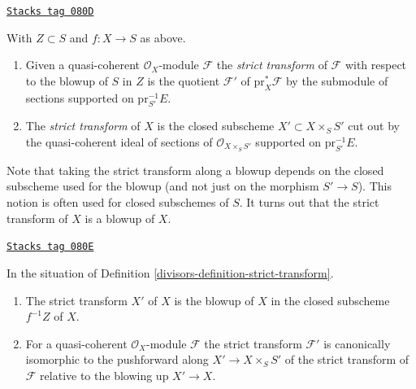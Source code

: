 \begin{definition}
\label{divisors-definition-strict-transform}
\href{https://stacks.math.columbia.edu/tag/080D}{\texttt{Stacks tag 080D}}

With $Z \subset S$ and $f : X \to S$ as above.
\begin{enumerate}
\item Given a quasi-coherent $\mathcal{O}_X$-module $\mathcal{F}$
the {\it strict transform} of $\mathcal{F}$ with respect to the blowup
of $S$ in $Z$ is the quotient $\mathcal{F}'$ of $\text{pr}_X^*\mathcal{F}$
by the submodule of sections supported on $\text{pr}_{S'}^{-1}E$.
\item The {\it strict transform} of $X$ is the closed subscheme
$X' \subset X \times_S S'$ cut out by the quasi-coherent ideal of
sections of $\mathcal{O}_{X \times_S S'}$ supported on $\text{pr}_{S'}^{-1}E$.
\end{enumerate}
\end{definition}

Note that taking the strict transform along a blowup depends on the
closed subscheme used for the blowup
(and not just on the morphism $S' \to S$).
This notion is often used for closed subschemes of $S$.
It turns out that the strict transform of $X$ is a blowup of $X$.

\begin{lemma}
\label{divisors-lemma-strict-transform}
\href{https://stacks.math.columbia.edu/tag/080E}{\texttt{Stacks tag 080E}}

In the situation of Definition \ref{divisors-definition-strict-transform}.
\begin{enumerate}
\item The strict transform $X'$ of $X$ is the blowup of $X$ in the closed
subscheme $f^{-1}Z$ of $X$.
\item For a quasi-coherent $\mathcal{O}_X$-module $\mathcal{F}$ the
strict transform $\mathcal{F}'$ is canonically isomorphic to
the pushforward along $X' \to X \times_S S'$ of the strict transform of
$\mathcal{F}$ relative to the blowing up $X' \to X$.
\end{enumerate}
\end{lemma}

